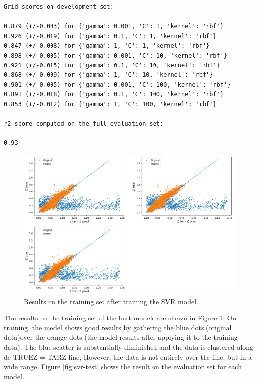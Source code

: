 \begin{verbatim}
Grid scores on development set:

0.879 (+/-0.003) for {'gamma': 0.001, 'C': 1, 'kernel': 'rbf'}
0.926 (+/-0.019) for {'gamma': 0.1, 'C': 1, 'kernel': 'rbf'}
0.847 (+/-0.008) for {'gamma': 1, 'C': 1, 'kernel': 'rbf'}
0.898 (+/-0.005) for {'gamma': 0.001, 'C': 10, 'kernel': 'rbf'}
0.921 (+/-0.015) for {'gamma': 0.1, 'C': 10, 'kernel': 'rbf'}
0.868 (+/-0.009) for {'gamma': 1, 'C': 10, 'kernel': 'rbf'}
0.901 (+/-0.005) for {'gamma': 0.001, 'C': 100, 'kernel': 'rbf'}
0.891 (+/-0.018) for {'gamma': 0.1, 'C': 100, 'kernel': 'rbf'}
0.853 (+/-0.012) for {'gamma': 1, 'C': 100, 'kernel': 'rbf'}

r2 score computed on the full evaluation set:

0.93

\end{verbatim}
\begin{figure}[th!]
	\centering
	\includegraphics[width=1.0\linewidth]{TeX_files/Imagenes/svr-train}
	\caption{Results on the training set after training the SVR model.}
	\label{fig:svr-train}
\end{figure}
The results on the training set of the best models are shown in Figure \ref{fig:svr-train}. On training, the model shows good results by gathering the blue dots (original data)over the orange dots (the model results after applying it to the training data). The blue scatter is substantially diminished and the data is clustered along de TRUEZ = TARZ line, However, the data is not entirely over the line, but in a wide range. Figure \ref{fig:svr-test} shows the result on the evaluation set for each model. 
